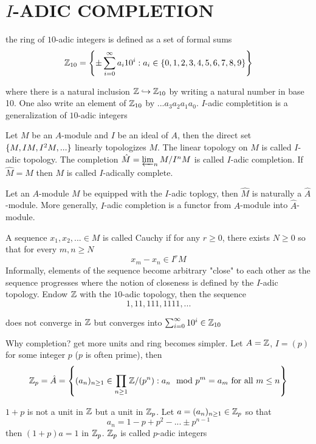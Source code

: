\section{$I$-ADIC COMPLETION}

the ring of $10$-adic integers is defined as a set of formal sums
$$
	\Z_{10} = \set*{\pm \sum_{i=0}^\infty a_i 10^i: a_i \in \set{0, 1, 2,3,4,5,6,7,8, 9}}
$$

where there is a natural inclusion $\Z \hookrightarrow \Z_{10}$ by writing a natural number in base 10. One also write an element of $\Z_{10}$ by $...a_3 a_2 a_1 a_0$. $I$-adic completition is a generalization of $10$-adic integers

\begin{definition}
	Let $M$ be an $A$-module and $I$ be an ideal of $A$, then the direct set $\set{M, IM, I^2 M, ...}$ linearly topologizes $M$. The linear topology on $M$ is called $I$-adic topology. The completion $\hat{M} = \varprojlim_{n} M / I^n M$ is called $I$-adic completion. If $\hat{M} = M$ then $M$ is called $I$-adically complete.
\end{definition}

\begin{remark}
	Let an $A$-module $M$ be equipped with the $I$-adic toplogy, then $\hat{M}$ is naturally a $\hat{A}$-module. More generally, $I$-adic completion is a functor from $A$-module into $\hat{A}$-module.
\end{remark}

\begin{remark}
	A sequence $x_1, x_2, ... \in M$ is called Cauchy if for any $r \geq 0$, there exists $N \geq 0$ so that for every $m, n \geq N$
	$$
		x_m - x_n \in I^r M
	$$
	Informally, elements of the sequence become arbitrary "close" to each other as the sequence progresses where the notion of closeness is defined by the $I$-adic topology.  Endow $\Z$ with the $10$-adic topology, then the sequence 
	$$
		1, 11, 111, 1111, ...
	$$
	
	does not converge in $\Z$ but converges into $\sum_{i=0}^\infty 10^i \in \Z_{10}$
\end{remark}


\begin{remark}
	Why completion? get more units and ring becomes simpler. Let $A = \Z$, $I = (p)$ for some integer $p$ ($p$ is often prime), then
	$$
	\Z_p = \hat{A} = \set*{(a_n)_{n \geq 1} \in \prod_{n \geq 1} \Z / (p^n): a_n \mod p^m = a_m \text{ for all } m \leq n}
	$$
	
	$1 + p$ is not a unit in $\Z$ but a unit in $\Z_p$. Let $a = (a_n)_{n \geq 1} \in \Z_p$ so that
	$$
	a_n = 1 - p + p^2 - ... \pm p^{n-1}
	$$
	then $(1 + p)a = 1$ in $\Z_p$. $\Z_p$ is called $p$-adic integers
\end{remark}



